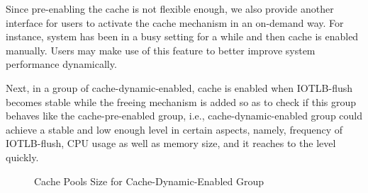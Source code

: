 Since pre-enabling the cache is not flexible enough, we also provide another interface for users to activate the cache mechanism in an on-demand way. For instance, system has been in a busy setting for a while and then cache is enabled manually. Users may make use of this feature to better improve system performance dynamically.

Next, in a group of cache-dynamic-enabled, cache is enabled when IOTLB-flush becomes stable while the freeing mechanism is added so as to check if this group behaves like the cache-pre-enabled group, i.e., cache-dynamic-enabled group could achieve a stable and low enough level in certain aspects, namely, frequency of IOTLB-flush, CPU usage as well as memory size, and it reaches to the level quickly.

\begin{figure}
\centering
{}
\hspace{1in} 
\hspace{1in} 
\caption{Cache Pools Size for Cache-Dynamic-Enabled Group}
\label{fig:dynPGpool} %
\end{figure}

